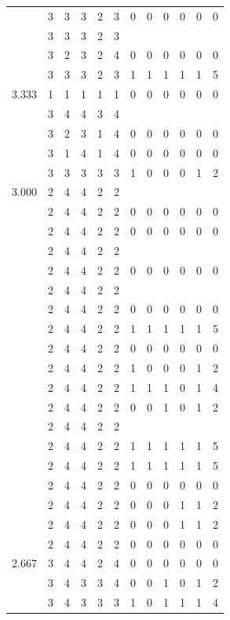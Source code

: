 \documentclass[]{book}
\theoremstyle{definition}
\theoremstyle{definition}
\theoremstyle{definition}
\theoremstyle{remark}
\begin{document}
\begin{table}
{\begin{tabular}[t]{rrrrrrrrrrrr}
 & 3 & 3 & 3 & 2 & 3 & 0 & 0 & 0 & 0 & 0 & 0\\
 & 3 & 3 & 3 & 2 & 3 &  &  &  &  &  & \\
 & 3 & 2 & 3 & 2 & 4 & 0 & 0 & 0 & 0 & 0 & 0\\
 & 3 & 3 & 3 & 2 & 3 & 1 & 1 & 1 & 1 & 1 & 5\\
3.333 & 1 & 1 & 1 & 1 & 1 & 0 & 0 & 0 & 0 & 0 & 0\\
 & 3 & 4 & 4 & 3 & 4 &  &  &  &  &  & \\
 & 3 & 2 & 3 & 1 & 4 & 0 & 0 & 0 & 0 & 0 & 0\\
 & 3 & 1 & 4 & 1 & 4 & 0 & 0 & 0 & 0 & 0 & 0\\
 & 3 & 3 & 3 & 3 & 3 & 1 & 0 & 0 & 0 & 1 & 2\\
3.000 & 2 & 4 & 4 & 2 & 2 &  &  &  &  &  & \\
 & 2 & 4 & 4 & 2 & 2 & 0 & 0 & 0 & 0 & 0 & 0\\
 & 2 & 4 & 4 & 2 & 2 & 0 & 0 & 0 & 0 & 0 & 0\\
 & 2 & 4 & 4 & 2 & 2 &  &  &  &  &  & \\
 & 2 & 4 & 4 & 2 & 2 & 0 & 0 & 0 & 0 & 0 & 0\\
 & 2 & 4 & 4 & 2 & 2 &  &  &  &  &  & \\
 & 2 & 4 & 4 & 2 & 2 & 0 & 0 & 0 & 0 & 0 & 0\\
 & 2 & 4 & 4 & 2 & 2 & 1 & 1 & 1 & 1 & 1 & 5\\
 & 2 & 4 & 4 & 2 & 2 & 0 & 0 & 0 & 0 & 0 & 0\\
 & 2 & 4 & 4 & 2 & 2 & 1 & 0 & 0 & 0 & 1 & 2\\
 & 2 & 4 & 4 & 2 & 2 & 1 & 1 & 1 & 0 & 1 & 4\\
 & 2 & 4 & 4 & 2 & 2 & 0 & 0 & 1 & 0 & 1 & 2\\
 & 2 & 4 & 4 & 2 & 2 &  &  &  &  &  & \\
 & 2 & 4 & 4 & 2 & 2 & 1 & 1 & 1 & 1 & 1 & 5\\
 & 2 & 4 & 4 & 2 & 2 & 1 & 1 & 1 & 1 & 1 & 5\\
 & 2 & 4 & 4 & 2 & 2 & 0 & 0 & 0 & 0 & 0 & 0\\
 & 2 & 4 & 4 & 2 & 2 & 0 & 0 & 0 & 1 & 1 & 2\\
 & 2 & 4 & 4 & 2 & 2 & 0 & 0 & 0 & 1 & 1 & 2\\
 & 2 & 4 & 4 & 2 & 2 & 0 & 0 & 0 & 0 & 0 & 0\\
2.667 & 3 & 4 & 4 & 2 & 4 & 0 & 0 & 0 & 0 & 0 & 0\\
 & 3 & 4 & 3 & 3 & 4 & 0 & 0 & 1 & 0 & 1 & 2\\
 & 3 & 4 & 3 & 3 & 3 & 1 & 0 & 1 & 1 & 1 & 4\\

\end{tabular}}
\end{table}
\end{document}
